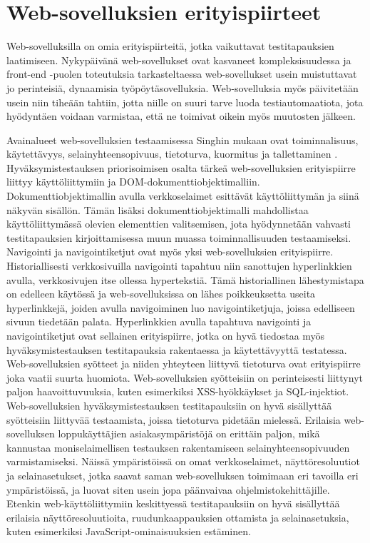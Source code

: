 \section{Web-sovelluksien erityispiirteet} \label{ch:08_websovelluksien_erityispiirteet}

  Web-sovelluksilla on omia erityispiirteitä, jotka vaikuttavat testitapauksien laatimiseen.
  Nykypäivänä web-sovellukset ovat kasvaneet kompleksisuudessa ja front-end -puolen toteutuksia tarkasteltaessa web-sovellukset usein muistuttavat jo perinteisiä, dynaamisia työpöytäsovelluksia.
  Web-sovelluksia myös päivitetään usein niin tiheään tahtiin, jotta niille on suuri tarve luoda testiautomaatiota, jota hyödyntäen voidaan varmistaa, että ne toimivat oikein myös muutosten jälkeen.

  Avainalueet web-sovelluksien testaamisessa Singhin mukaan ovat toiminnalisuus, käytettävyys, selainyhteensopivuus, tietoturva, kuormitus ja tallettaminen \cite[s.~456]{software_testing_book}.
  Hyväksymistestauksen priorisoimisen osalta tärkeä web-sovelluksien erityispiirre liittyy käyttöliittymiin ja DOM-dokumenttiobjektimalliin.
  Dokumenttiobjektimallin avulla verkkoselaimet esittävät käyttöliittymän ja siinä näkyvän sisällön.
  Tämän lisäksi dokumenttiobjektimalli mahdollistaa käyttöliittymässä olevien elementtien valitsemisen, jota hyödynnetään vahvasti testitapauksien kirjoittamisessa muun muassa toiminnallisuuden testaamiseksi.
  Navigointi ja navigointiketjut ovat myös yksi web-sovelluksien erityispiirre.
  Historiallisesti verkkosivuilla navigointi tapahtuu niin sanottujen hyperlinkkien avulla, verkkosivujen itse ollessa hypertekstiä.
  Tämä historiallinen lähestymistapa on edelleen käytössä ja web-sovelluksissa on lähes poikkeuksetta useita hyperlinkkejä, joiden avulla navigoiminen luo navigointiketjuja, joissa edelliseen sivuun tiedetään palata.
  Hyperlinkkien avulla tapahtuva navigointi ja navigointiketjut ovat sellainen erityispiirre, jotka on hyvä tiedostaa myös hyväksymistestauksen testitapauksia rakentaessa ja käytettävyyttä testatessa.
  Web-sovelluksien syötteet ja niiden yhteyteen liittyvä tietoturva ovat erityispiirre joka vaatii suurta huomiota.
  Web-sovelluksien syötteisiin on perinteisesti liittynyt paljon haavoittuvuuksia, kuten esimerkiksi XSS-hyökkäykset ja SQL-injektiot.
  Web-sovelluksien hyväksymistestauksen testitapauksiin on hyvä sisällyttää syötteisiin liittyvää testaamista, joissa tietoturva pidetään mielessä.
  Erilaisia web-sovelluksen loppukäyttäjien asiakasympäristöjä on erittäin paljon, mikä kannustaa moniselaimellisen testauksen rakentamiseen selainyhteensopivuuden varmistamiseksi.
  Näissä ympäristöissä on omat verkkoselaimet, näyttöresoluutiot ja selainasetukset, jotka saavat saman web-sovelluksen toimimaan eri tavoilla eri ympäristöissä, ja luovat siten usein jopa päänvaivaa ohjelmistokehittäjille.
  Etenkin web-käyttöliittymiin keskittyessä testitapauksiin on hyvä sisällyttää erilaisia näyttöresoluutioita, ruudunkaappauksien ottamista ja selainasetuksia, kuten esimerkiksi JavaScript-ominaisuuksien estäminen.

